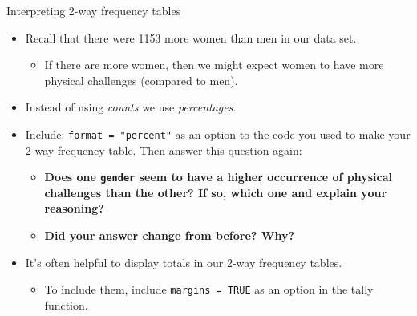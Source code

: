 \documentclass[
  ignorenonframetext,
]{beamer}
\providecommand{\tightlist}{%
  \setlength{\itemsep}{0pt}\setlength{\parskip}{0pt}}
\begin{document}
\begin{frame}[fragile]{Interpreting 2-way frequency tables}
\protect\hypertarget{interpreting-2-way-frequency-tables}{}

\begin{itemize}
\tightlist
\item
  Recall that there were 1153 more women than men in our data set.

  \begin{itemize}
  \tightlist
  \item
    If there are more women, then we might expect women to have more
    physical challenges (compared to men).
  \end{itemize}
\item
  Instead of using \emph{counts} we use \emph{percentages}.
\item
  Include: \texttt{format\ =\ "percent"} as an option to the code you
  used to make your 2-way frequency table. Then answer this question
  again:

  \begin{itemize}
  \tightlist
  \item
    \textbf{Does one \texttt{gender} seem to have a higher occurrence of
    physical challenges than the other? If so, which one and explain
    your reasoning?}
  \item
    \textbf{Did your answer change from before? Why?}
  \end{itemize}
\item
  It's often helpful to display totals in our 2-way frequency tables.

  \begin{itemize}
  \tightlist
  \item
    To include them, include \texttt{margins\ =\ TRUE} as an option in
    the tally function.
  \end{itemize}
\end{itemize}

\end{frame}
\end{document}
